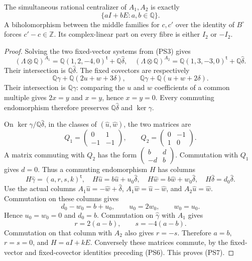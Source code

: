 \begin{lemma}
\label{wb:pshift:lem:centralizer}
The simultaneous rational centralizer of $A_1,A_2$ is exactly
\[
 \{aI+bE:a,b\in\mathbb Q\}.
 \tag{PS7}\label{wb:pshift:eq:centralizer}
\]
A biholomorphism between the middle families for $c,c'$ over the
identity of $B^\circ$ forces $c'-c\in\mathbb Z$. Its complex-linear
part on every fibre is either $I_2$ or $-I_2$.
\end{lemma}


\begin{proof}
Solving the two fixed-vector systems from (PS3) gives
\[
 (\Lambda\otimes\mathbb Q)^{A_1}
   =\mathbb Q(1,2,-4,0)^{\mathsf t}+\mathbb Q\widehat\delta,
 \quad
 (\Lambda\otimes\mathbb Q)^{A_2}
   =\mathbb Q(1,3,-3,0)^{\mathsf t}+\mathbb Q\widehat\delta.
\]
Their intersection is $\mathbb Q\widehat\delta$. The fixed covectors
are respectively
\[
 \mathbb Q\gamma+\mathbb Q(2u+w+3\delta),\qquad
 \mathbb Q\gamma+\mathbb Q(u+w+2\delta).
\]
Their intersection is $\mathbb Q\gamma$: comparing the $u$ and $w$
coefficients of a common multiple gives $2x=y$ and $x=y$, hence
$x=y=0$. Every commuting endomorphism therefore preserves
$\mathbb Q\widehat\delta$ and $\ker\gamma$.

On $\ker\gamma/\mathbb Q\widehat\delta$, in the classes of
$(\widehat u,\widehat w)$, the two matrices are
\[
 Q_1=\begin{pmatrix}0&1\\-1&-1\end{pmatrix},\qquad
 Q_2=\begin{pmatrix}0&-1\\1&0\end{pmatrix}.
\]
A matrix commuting with $Q_2$ has the form
$\left(\begin{smallmatrix}b&d\\-d&b\end{smallmatrix}\right)$.
Commutation with $Q_1$ gives $d=0$. Thus a commuting endomorphism $H$
has columns
\[
 H\widehat\gamma=(a,r,s,k)^{\mathsf t},\quad
 H\widehat u=b\widehat u+u_0\widehat\delta,\quad
 H\widehat w=b\widehat w+w_0\widehat\delta,\quad
 H\widehat\delta=d_0\widehat\delta.
\]
Use the actual columns $A_1\widehat u=-\widehat w+\widehat\delta$,
$A_1\widehat w=\widehat u-\widehat w$, and
$A_2\widehat u=\widehat w$. Commutation on these columns gives
\[
 d_0-w_0=b+u_0,\qquad u_0=2w_0,\qquad w_0=u_0.
\]
Hence $u_0=w_0=0$ and $d_0=b$. Commutation on
$\widehat\gamma$ with $A_1$ gives
\[
 r=2(a-b),\qquad s=-4(a-b).
\]
Commutation on that column with $A_2$ also gives $r=-s$.
Therefore $a=b$, $r=s=0$, and $H=aI+kE$. Conversely these matrices
commute, by the fixed-vector and fixed-covector identities preceding
(PS6). This proves (PS7).


\end{proof}
